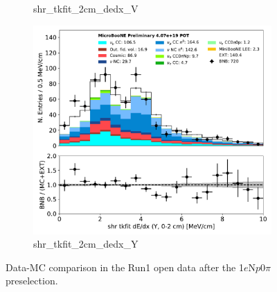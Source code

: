 \documentclass[a4paper]{article}
\newcommand{\npsel}{1$e$N$p$0$\pi$ }
\begin{document}
\begin{figure}[H]
\begin{center}
\begin{subfigure}[b]{0.3\textwidth}
    \caption{\label{fig:1eNp:dataMCRun1:shr_tkfit_2cm_dedx_V} shr\_tkfit\_2cm\_dedx\_V }
    \end{subfigure}
    \begin{subfigure}[b]{0.3\textwidth}
    \centering
    \includegraphics[width=1.00\textwidth]{1eNp/dataMCRun1/shr_tkfit_2cm_dedx_Y01152020.pdf}
    \caption{\label{fig:1eNp:dataMCRun1:shr_tkfit_2cm_dedx_Y} shr\_tkfit\_2cm\_dedx\_Y }
    \end{subfigure}
\caption{\label{fig:1eNp:dataMCRun1:shr_tkfit_2cm_dedx}Data-MC comparison in the Run1 open data after the \npsel preselection.}
\end{center}
\end{figure}
\end{document}
